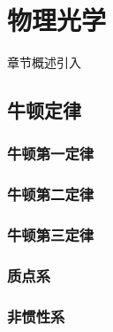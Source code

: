 \chapter{物理光学}\label{27}

章节概述引入

\section{牛顿定律}\label{27-1}

\subsection{牛顿第一定律}\label{27-1-1}

\subsection{牛顿第二定律}\label{27-1-2}

\subsection{牛顿第三定律}\label{27-1-3}

\subsection{质点系}\label{27-1-4}

\subsection{非惯性系}\label{27-1-5}